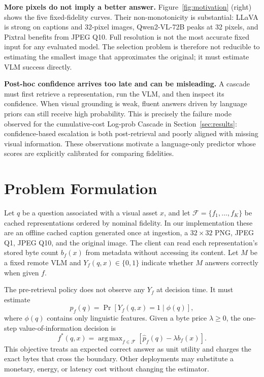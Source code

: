 \documentclass[10pt,conference]{IEEEtran}
\DeclareMathOperator*{\argmax}{arg\,max}
\newcommand{\fset}{\mathcal{F}}
\newcommand{\tableformat}{\footnotesize\setlength{\tabcolsep}{3.5pt}\renewcommand{\arraystretch}{0.95}}
\begin{document}
\textbf{More pixels do not imply a better answer.}
Figure~\ref{fig:motivation} (right) shows the five fixed-fidelity curves. Their
non-monotonicity is substantial: LLaVA is strong on captions and 32-pixel
images, Qwen2-VL-72B peaks at 32 pixels, and Pixtral benefits from JPEG Q10.
Full resolution is not the most accurate fixed input for any evaluated model.
The selection problem is therefore not reducible to estimating the smallest
image that approximates the original; it must estimate VLM success directly.

\textbf{Post-hoc confidence arrives too late and can be misleading.}
A cascade must first retrieve a representation, run the VLM, and then inspect
its confidence. When visual grounding is weak, fluent answers driven by
language priors can still receive high probability. This is precisely the
failure mode observed for the cumulative-cost Log-prob Cascade in
Section~\ref{sec:results}: confidence-based escalation is both post-retrieval
and poorly aligned with missing visual information. These observations motivate
a language-only predictor whose scores are explicitly calibrated for comparing
fidelities.

\begin{table}[t]
\centering
\tableformat
\caption{Fixed-fidelity accuracy (\%) underlying
Figure~\ref{fig:motivation}. The best input is model-dependent and is never the
full image in this population.}
\label{tab:fixed}

\end{table}

\section{Problem Formulation}
\label{sec:problem}

Let $q$ be a question associated with a visual asset $x$, and let
$\fset=\{f_1,\ldots,f_K\}$ be cached representations ordered by nominal
fidelity. In our implementation these are an offline cached caption generated
once at ingestion, a $32\!\times\!32$ PNG, JPEG Q1, JPEG Q10, and the original
image.
The client can read each representation's stored byte count $b_f(x)$ from
metadata without accessing its content. Let $M$ be a fixed remote VLM and
$Y_f(q,x)\in\{0,1\}$ indicate whether $M$ answers correctly when given $f$.

The pre-retrieval policy does not observe any $Y_f$ at decision time. It must
estimate
\begin{equation}
  p_f(q)=\Pr\!\left[Y_f(q,x)=1\mid \phi(q)\right],
  \label{eq:success}
\end{equation}
where $\phi(q)$ contains only linguistic features. Given a byte price
$\lambda\geq0$, the one-step value-of-information decision is
\begin{equation}
  f^*(q,x)=\argmax_{f\in\fset}
  \left[\widehat p_f(q)-\lambda b_f(x)\right].
  \label{eq:utility}
\end{equation}
This objective treats an expected correct answer as unit utility and charges
the exact bytes that cross the boundary. Other deployments may substitute a
monetary, energy, or latency cost without changing the estimator.
\end{document}
